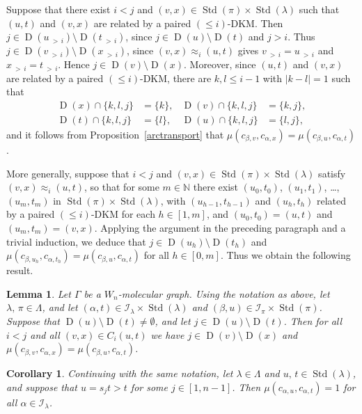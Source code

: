 \documentclass[10pt]{amsart}
\newtheorem{lemm}[theo]{Lemma}
\newtheorem{coro}[theo]{Corollary}
\theoremstyle{definition}
\newcommand{\morethan}[2]{#1\,{_{>\,#2}}}
\DeclareMathOperator{\STD}{Std}
\DeclareMathOperator{\D}{D}
\begin{document}
Suppose that there exist $i<j$ and
$(v,x)\in\STD(\pi)\times\STD(\lambda)$ such that $(u,t)$ and $(v,x)$
are related by a paired $(\leqslant i)$-DKM.
Then $j\in\D(\morethan ui)\setminus\D(\morethan ti)$, since $j\in\D(u)\setminus\D(t)$
and $j>i$. Thus $j\in\D(\morethan vi)\setminus\D(\morethan xi)$, since
$(v,x)\approx_i(u,t)$ gives $\morethan vi=\morethan ui$ and $\morethan xi=\morethan ti$.
Hence $j\in\D(v)\setminus\D(x)$. Moreover, since $(u,t)$ and $(v,x)$ are related by a
paired $(\leqslant i)$-DKM,
there are $k,l\leqslant i-1$ with $|k-l|=1$ such that
\begin{align*}
\qquad&&\D(x)\cap \{k,l,j\} &= \{k\},&\D(v)\cap \{k,l,j\} &= \{k,j\},&&\qquad\\
\qquad&&\D(t)\cap \{k,l,j\} &= \{l\},&\D(u)\cap \{k,l,j\} &= \{l,j\},&&\qquad
\end{align*}
and it follows from Proposition~\ref{arctransport}
that $\mu(c_{\beta,v},c_{\alpha,x})=\mu(c_{\beta,u},c_{\alpha,t})$.

More generally, suppose that $i<j$ and $(v,x)\in\STD(\pi)\times\STD(\lambda)$ satisfy
$(v,x)\approx_i (u,t)$, so that for some $m\in\mathbb{N}$ there exist
$(u_0,t_0)$, $(u_1,t_1)$, \dots, $(u_m,t_m)$ in $\STD(\pi)\times\STD(\lambda)$,
with $(u_{h-1},t_{h-1})$ and $(u_h,t_h)$ related by a paired
$(\leqslant i)$-DKM
for each $h\in[1,m]$, and $(u_0,t_0)=(u,t)$
and $(u_m,t_m)=(v,x)$. Applying the argument in the preceding paragraph and a trivial induction,
we deduce that $j\in\D(u_h)\setminus\D(t_h)$ and
$\mu(c_{\beta,u_h},c_{\alpha,t_h})=\mu(c_{\beta,u},c_{\alpha,t})$ for all $h\in[0,m]$.
Thus we obtain the following result.

\begin{lemm}\label{noname0}
Let $\Gamma$ be a $W_n$-molecular graph. Using the notation as above, let $\lambda,\,\pi\in\Lambda$,
and let $(\alpha,t)\in\mathcal{I}_\lambda\times\STD(\lambda)$ and
$(\beta,u)\in\mathcal{I}_\pi\times\STD(\pi)$. Suppose that $\D(u)\setminus\D(t)\neq\emptyset$, and
let $j\in\D(u)\setminus\D(t)$. Then for all $i<j$ and all $(v,x)\in C_i(u,t)$ we have
$j\in\D(v)\setminus\D(x)$ and $\mu(c_{\beta,v},c_{\alpha,x})=\mu(c_{\beta,u},c_{\alpha,t})$.
\end{lemm}

\begin{coro}\label{arweightone}
Continuing with the same notation,
let $\lambda\in\Lambda$ and $u,\,t\in\STD(\lambda)$, and suppose that
$u=s_jt>t$ for some $j\in[1,n-1]$. Then $\mu(c_{\alpha,u},c_{\alpha,t}) = 1$
for all $\alpha\in\mathcal{I}_{\lambda}$.
\end{coro}
\end{document}
